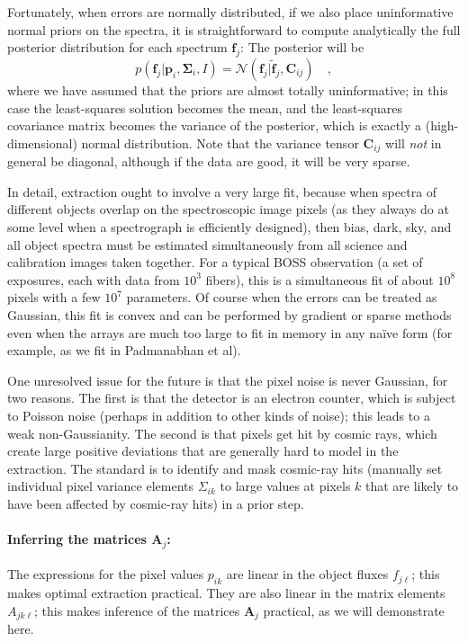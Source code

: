 \documentclass[12pt]{article}
\newcommand{\hmatrix}[1]{\boldsymbol{#1}}
\newcommand{\Amatrix}{\hmatrix{A}}
\newcommand{\pixels}{\hmatrix{p}}
\newcommand{\flux}{\hmatrix{f}}
\newcommand{\fluxLSF}{\hmatrix{\tilde{f}}}
\newcommand{\pixelvariance}{\hmatrix{\Sigma}}
\newcommand{\covariance}{\hmatrix{C}}
\newcommand{\Normal}{\mathscr{N}}
\begin{document}
Fortunately, when errors are normally distributed, if we also place
uninformative normal priors on the spectra, it is straightforward to
compute analytically the full posterior distribution for each spectrum
$\flux_j$: The posterior will be
\begin{equation}
p(\flux_j|\pixels_i,\pixelvariance_i,I) =
  \Normal(\flux_j|\fluxLSF_j,\covariance_{ij}) \quad,
\end{equation}
where we have assumed that the priors are almost totally
uninformative; in this case the least-squares solution becomes the
mean, and the least-squares covariance matrix becomes the variance of
the posterior, which is exactly a (high-dimensional) normal
distribution.  Note that the variance tensor $\covariance_{ij}$ will
\emph{not} in general be diagonal, although if the data are good, it
will be very sparse.

In detail, extraction ought to involve a very large fit, because when
spectra of different objects overlap on the spectroscopic image pixels
(as they always do at some level when a spectrograph is efficiently
designed), then bias, dark, sky, and all object spectra must be
estimated simultaneously from all science and calibration images taken
together.  For a typical BOSS observation (a set of exposures, each
with data from $10^3$ fibers), this is a simultaneous fit of about
$10^8$ pixels with a few $10^7$ parameters.  Of course when the errors
can be treated as Gaussian, this fit is convex and can be performed by
gradient or sparse methods even when the arrays are much too large to
fit in memory in any na\"ive form (for example, as we fit in
Padmanabhan et al).

One unresolved issue for the future is that the pixel noise is never
Gaussian, for two reasons.  The first is that the detector is an
electron counter, which is subject to Poisson noise (perhaps in
addition to other kinds of noise); this leads to a weak
non-Gaussianity.  The second is that pixels get hit by cosmic rays,
which create large positive deviations that are generally hard to
model in the extraction.  The standard is to identify and mask
cosmic-ray hits (manually set individual pixel variance elements
$\Sigma_{ik}$ to large values at pixels $k$ that are likely to have
been affected by cosmic-ray hits) in a prior step.

\paragraph{Inferring the matrices $\Amatrix_j$:}
The expressions for the pixel values $p_{ik}$ are linear in the object
fluxes $f_{j\ell}$; this makes optimal extraction practical.  They are
also linear in the matrix elements $A_{jk\ell}$; this makes inference
of the matrices $\Amatrix_j$ practical, as we will demonstrate here.
\end{document}

